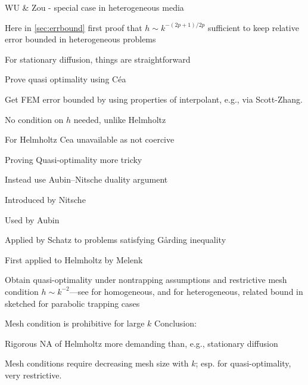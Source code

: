   \item WU \& Zou - special case in heterogeneous media
\item Here in \cref{sec:errbound} first proof that $h\sim k^{-(2p+1)/2p}$ sufficient to keep relative error bounded in heterogeneous problems
\eit
\item For stationary diffusion, things are straightforward
\item Prove quasi optimality using C\'ea
\item Get FEM error bounded by using properties of interpolant, e.g., via Scott-Zhang.
\item No condition on $h$ needed, unlike Helmholtz
\item For Helmholtz Cea unavailable as not coercive
\item Proving Quasi-optimality more tricky
\item Instead use Aubin--Nitsche duality argument
\bit
\item Introduced by Nitsche
\item Used by Aubin
\item Applied by Schatz to problems satisfying G\r{a}rding inequality
\item First applied to Helmholtz by Melenk
\item Obtain quasi-optimality under nontrapping assumptions and restrictive mesh condition $h \sim k^{-2}$---see \cite[Proposition 8.2.7]{Me:95} for homogeneous, \cite{GrSa:18} and \cite[Theorem 3]{GaSpWu:18} for heterogeneous, related bound in \cite[Section 1.4]{ChSpGiSm:17} sketched for parabolic trapping cases
\item Mesh condition is prohibitive for large $k$
\eit
\eit
Conclusion:
\bit
\item Rigorous NA of Helmholtz more demanding than, e.g., stationary diffusion
\item Mesh conditions require decreasing mesh size with $k$; esp. for quasi-optimality, very restrictive.
\eit






